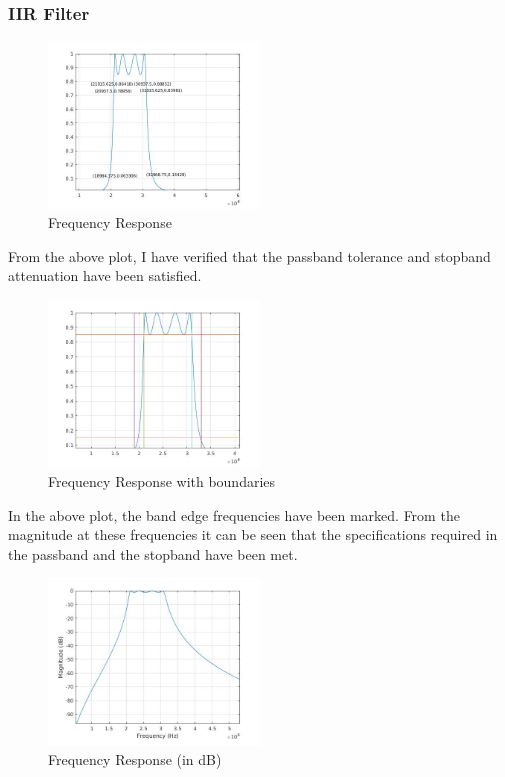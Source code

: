 \documentclass[12pt]{article}
\begin{document}
\subsubsection{IIR Filter}
\begin{figure}[h!]
	\centering	
	\includegraphics[width = 0.5\textwidth]{1fil.jpg}
    \caption{Frequency Response}
\end{figure}
From the above plot, I have verified that the passband tolerance and stopband attenuation have been satisfied. 
\begin{figure}[h!]
	\centering	
	\includegraphics[width = 0.5\textwidth]{1filb.jpg}
    \caption{Frequency Response with boundaries}
\end{figure}
In the above plot, the band edge frequencies have been marked. From the magnitude at these frequencies it can be seen that the specifications required in the passband  and the stopband have been met.
\begin{figure}[h!]
	\centering	
	\includegraphics[width = 0.5\textwidth]{1filp.jpg}
    \caption{Frequency Response (in dB)}
\end{figure}
\end{document}
